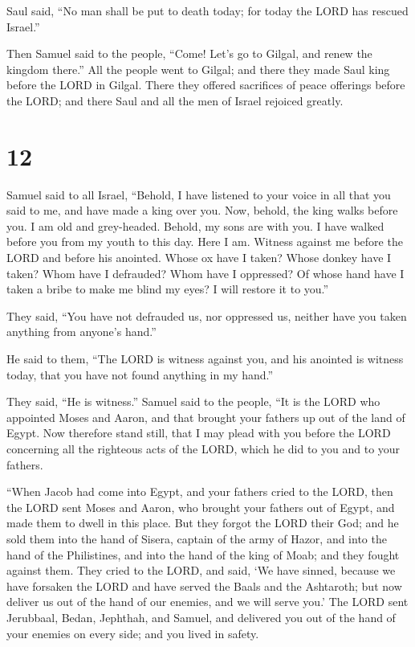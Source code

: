 Saul said, ``No man shall be put to death today; for today
the LORD has rescued Israel.''

 Then Samuel said to the people, ``Come! Let's go to
Gilgal, and renew the kingdom there.''  All the people went
to Gilgal; and there they made Saul king before the LORD in Gilgal.
There they offered sacrifices of peace offerings before the LORD; and
there Saul and all the men of Israel rejoiced greatly.

\hypertarget{section-11}{%
\section{12}\label{section-11}}

 Samuel said to all Israel, ``Behold, I have listened to
your voice in all that you said to me, and have made a king over you.
 Now, behold, the king walks before you. I am old and
grey-headed. Behold, my sons are with you. I have walked before you from
my youth to this day.  Here I am. Witness against me before
the LORD and before his anointed. Whose ox have I taken? Whose donkey
have I taken? Whom have I defrauded? Whom have I oppressed? Of whose
hand have I taken a bribe to make me blind my eyes? I will restore it to
you.''

 They said, ``You have not defrauded us, nor oppressed us,
neither have you taken anything from anyone's hand.''

 He said to them, ``The LORD is witness against you, and his
anointed is witness today, that you have not found anything in my
hand.''

They said, ``He is witness.''  Samuel said to the people,
``It is the LORD who appointed Moses and Aaron, and that brought your
fathers up out of the land of Egypt.  Now therefore stand
still, that I may plead with you before the LORD concerning all the
righteous acts of the LORD, which he did to you and to your fathers.

 ``When Jacob had come into Egypt, and your fathers cried to
the LORD, then the LORD sent Moses and Aaron, who brought your fathers
out of Egypt, and made them to dwell in this place.  But
they forgot the LORD their God; and he sold them into the hand of
Sisera, captain of the army of Hazor, and into the hand of the
Philistines, and into the hand of the king of Moab; and they fought
against them.  They cried to the LORD, and said, `We have
sinned, because we have forsaken the LORD and have served the Baals and
the Ashtaroth; but now deliver us out of the hand of our enemies, and we
will serve you.'  The LORD sent Jerubbaal, Bedan, Jephthah,
and Samuel, and delivered you out of the hand of your enemies on every
side; and you lived in safety.


